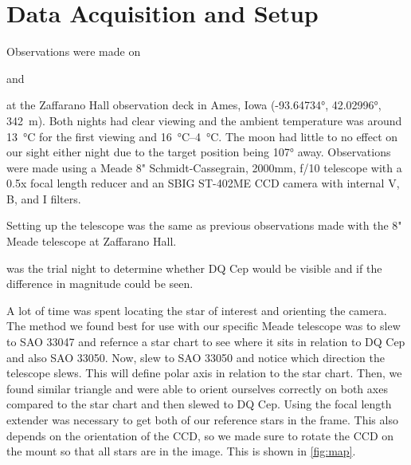 \documentclass[%
aip,
jmp,
reprint,
floatfix,
nofootinbib
]{revtex4-1}
\begin{document}


	\section{Data Acquisition and Setup}
	Observations were made on \date{27 September 2017} and \date{18 October 2017} at the Zaffarano Hall observation deck in Ames, Iowa (\ang{-93.64734}, \ang{42.02996}, \SI{342}{\meter}). Both nights had clear viewing and the ambient temperature was around \SI{13}{\degreeCelsius} for the first viewing and \SIrange{16}{4}{\degreeCelsius}. The moon had little to no effect on our sight either night due to the target position being \ang{107} away. Observations were made using a Meade 8" Schmidt-Cassegrain, 2000mm, f/10 telescope with a 0.5x focal length reducer and an SBIG ST-402ME CCD camera with internal V, B, and I filters. 
	
	Setting up the telescope was the same as previous observations made with the 8" Meade telescope at Zaffarano Hall. \date{27 September 2017} was the trial night to determine whether DQ Cep would be visible and if the difference in magnitude could be seen. 
	
	A lot of time was spent locating the star of interest and orienting the camera. The method we found best for use with our specific Meade telescope was to slew to SAO 33047 and refernce a star chart to see where it sits in relation to DQ Cep and also SAO 33050. Now, slew to SAO 33050 and notice which direction the telescope slews. This will define polar axis in relation to the star chart. Then, we found similar triangle and were able to orient ourselves correctly on both axes compared to the star chart and then slewed to DQ Cep. Using the focal length extender was necessary to get both of our reference stars in the frame. This also depends on the orientation of the CCD, so we made sure to rotate the CCD on the mount so that all stars are in the image. This is shown in \autoref{fig:map}. 
	
\end{document}
